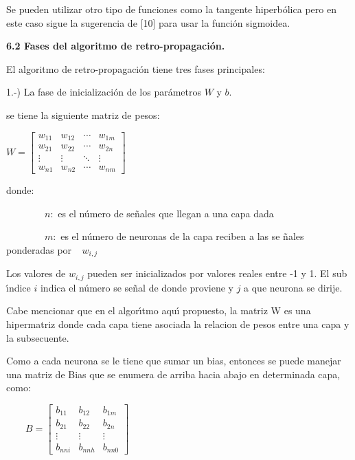 Se pueden utilizar otro tipo de funciones como la tangente hiperb\'{o}lica
pero en este caso sigue la sugerencia de [10] para usar la funci\'{o}n
sigmoidea.

\textbf{6.2 Fases del algoritmo de retro-propagaci\'{o}n.}

El algoritmo de retro-propagaci\'{o}n tiene tres fases principales:

1.-) La fase de inicializaci\'{o}n de los par\'{a}metros $W$ y $b$.

se tiene la siguiente matriz de pesos:

\begin{center}
\qquad $W=$\bigskip $\left[
\begin{array}{cccc}
w_{11} & w_{12} & \cdots  & w_{1m} \\
w_{21} & w_{22} & \cdots  & w_{2n} \\
\vdots  & \vdots  & \ddots  & \vdots  \\
w_{n1} & w_{n2} & \cdots  & w_{nm}%
\end{array}%
\right] $
\end{center}

donde:

\bigskip $\qquad \qquad n:$ es el n\'{u}mero de se\~{n}ales que llegan a una
capa dada

$\qquad \qquad m:$ es el n\'{u}mero de neuronas de la capa reciben a las se%
\~{n}ales ponderadas por$\ \ \ \ \ w_{i,j}$

Los valores de $w_{i,j}$ pueden ser inicializados por valores reales entre
-1 y 1. El sub \'{\i}ndice $i$ indica el n\'{u}mero se se\~{n}al de donde
proviene y $j$ a que neurona se dirije.

Cabe mencionar que en el algor\'{\i}tmo aqu\'{\i} propuesto, la matriz W es
una hipermatriz donde cada capa tiene asociada la relacion de pesos entre
una capa y la subsecuente.

Como a cada neurona se le tiene que sumar un bias, entonces se puede manejar
una matriz de Bias que se enumera de arriba hacia abajo en determinada capa,
como:

\begin{center}
$\qquad B=\left[
\begin{array}{ccc}
b_{11} & b_{12} & b_{1m} \\
b_{21} & b_{22} & b_{2n} \\
\vdots  & \vdots  & \vdots  \\
b_{nni} & b_{nnh} & b_{nn0}%
\end{array}%
\right] $
\end{center}

